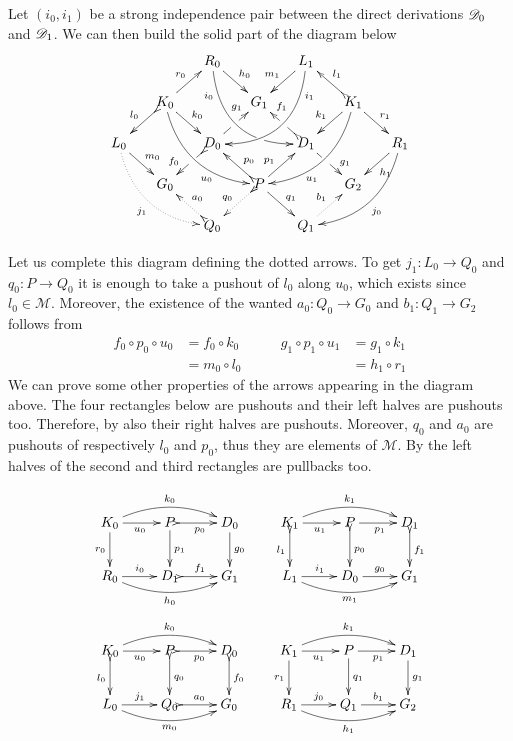 \begin{remark}\label{rem:deco} 
	Let $(i_0, i_1)$ be a strong
	independence pair between the direct derivations $\mathscr{D}_0$ and
	$\mathscr{D}_1$. We can then build the solid part of the diagram
	below
	\[\xymatrix@C=15pt@R=15pt{&&R_0 \ar@/_.8cm/[ddrr]_(.2){i_0}|(.7)\hole
		\ar[dr]^{h_0}&& L_1\ar@/^.8cm/[ddll]^(.2){i_1}
		\ar[dl]_{m_1}\\&K_0\ar[dr]^{k_0}\ar@{>->}[dl]_{l_0}
		\ar@/_.6cm/[ddrr]_(.65){u_0}\ar[ur]^{r_0}&& G_1 && K_1
		\ar@/^.6cm/[ddll]^(.65){u_1}\ar[dl]_{k_1}\ar@{>->}[lu]_{l_1}
		\ar[dr]^{r_1}\\L_0 \ar[dr]^{m_0}
		\ar@{.>}@/_.6cm/[ddrr]_{j_1}&& D_0
		\ar@{>->}[dl]|(.42)\hole_(.64){f_0}\ar[ur]|(.48)\hole^(.7){g_1}&&D_1
		\ar[dr]|(.42)\hole^(.65){g_1}
		\ar@{>->}[ul]|(.48)\hole_(.7){f_1}&&R_1\ar@/^.6cm/[ddll]^{j_0}\ar[dl]^{h_1}\\&G_0
		&&P\ar[dr]^{q_1}
		\ar@{>.>}[dl]_{q_0}\ar[ur]^(.4){p_1}\ar@{>->}[ul]_(.4){p_0}&&G_2\\&&Q_0
		\ar@{>->}@{>.>}[ul]_{a_0} &&Q_1\ar@{.>}[ur]^{b_1}}
	\]
	
	Let us complete this diagram defining the dotted arrows. To get
	$j_1\colon L_0\to Q_0$ and $q_0\colon P\to Q_0$ it is enough to
	take a pushout of $l_0$ along $u_0$, which exists since
	$l_0\in \mathcal{M}$. Moreover, the existence of the wanted
	$a_0\colon Q_0\to G_0$ and $b_1\colon Q_1\to G_2$ follows from
	\[\begin{split}
	f_0\circ p_0 \circ u_0 &= f_0\circ k_0 \\&= m_0\circ l_0
	\end{split}
	 \qquad\begin{split}
	 	g_1\circ p_1\circ u_1 &= g_1\circ k_1\\&=h_1\circ r_1
	 \end{split}
	\]
	We can prove some other properties of
		the arrows appearing in the diagram above. The four rectangles
		below are pushouts and their left halves are pushouts
		too. Therefore, by  also their right halves are
		pushouts.  Moreover, $q_0$ and $a_0$ are pushouts of
		respectively $l_0$ and $p_0$, thus they are elements of
		$\mathcal{M}$. By  the left halves of the
		second and third rectangles are pullbacks too.
		
		\[\xymatrix{K_0 \ar@/^.4cm/[rr]^{k_0}\ar[d]_{r_0}\ar[r]_{u_0}
			&P\ar[d]^{p_1} \ar@{>->}[r]_{p_0} & D_0 \ar[d]^{g_0}&K_1
			\ar@/^.4cm/[rr]^{k_1}\ar@{>->}[d]_{l_1}\ar[r]_{u_1}
			&P\ar@{>->}[d]^{p_0} \ar[r]_{p_1} & D_1 \ar@{>->}[d]^{f_1}\\
			R_0 \ar@/_.4cm/[rr]_{h_0} \ar[r]^{i_0}&D_1 \ar@{>->}[r]^{f_1}
			& G_1&L_1 \ar@/_.4cm/[rr]_{m_1} \ar[r]^{i_1}&D_0\ar[r]^{g_0} &
			G_1}\]
			\[\xymatrix{K_0
			\ar@/^.4cm/[rr]^{k_0}\ar@{>->}[d]_{l_0}\ar[r]_{u_0}
			&P\ar@{>->}[d]^{q_0} \ar@{>->}[r]_{p_0} & D_0
			\ar@{>->}[d]^{f_0}&K_1
			\ar@/^.4cm/[rr]^{k_1}\ar[d]_{r_1}\ar[r]_{u_1}
			&P\ar[d]^{q_1} \ar[r]_{p_1} & D_1 \ar[d]^{g_1}\\
			L_0 \ar@/_.4cm/[rr]_{m_0} \ar[r]^{j_1}&Q_0 \ar@{>->}[r]^{a_0}
			& G_0&R_1 \ar@/_.4cm/[rr]_{h_1} \ar[r]^{j_0}&Q_1 \ar[r]^{b_1}
			& G_2}\]
\end{remark}

